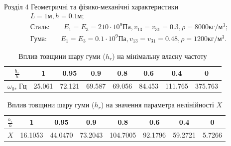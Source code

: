 \documentclass[handout, 8pt]{beamer}
\numberwithin{figure}{section}
\numberwithin{equation}{section}
\numberwithin{table}{section}
\begin{document}
\begin{frame}{Розділ 4}
Геометричні та фізико-механічні характеристики
\begin{equation}
\begin{gathered}
L=1\text{м}, h=0.1\text{м};\\
\text{Сталь:}\qquad
E_1=E_3=210\cdot 10^{9} Па, v_{13}=v_{31}=0.3, \rho=8000 кг/м^3;\\
\text{Гума:}\qquad
E_1=E_3=0.1\cdot 10^{9} Па, v_{13}=v_{31}=0.48, \rho=1200 кг/м^3.
\end{gathered}
\end{equation}

\begin{table}[h!]
\caption{Вплив товщини шару гуми ($h_{r}$) на мінімальну власну частоту}
\centering
 \begin{tabular}{| c | c | c | c | c | c | c | c |} 
 \hline
 $\displaystyle \frac{h_{r}}{h}$ & 1 & 0.95 & 0.9 & 0.8 & 0.6 & 0.4 & 0 \\ 
  \hline
 $\omega_0$, Гц & 25.061 & 72.121 & 69.587 & 69.056 & 84.453 & 111.765 & 375.763 \\
   \hline
\end{tabular}
\end{table}

\begin{table}[h!]
\caption{Вплив товщини шару гуми ($h_{r}$) на значення параметра нелінійності $X$}
\centering
 \begin{tabular}{| c | c | c | c | c | c | c | c |} 
 \hline
 $\displaystyle \frac{h_{r}}{h}$ & 1 & 0.95 & 0.9 & 0.8 & 0.6 & 0.4 & 0 \\ 
  \hline
 $X$ & 16.1053 & 44.0470 & 73.2043 & 104.7005 & 92.1796 & 59.2721 & 5.7266 \\
   \hline
\end{tabular}
\end{table}

\end{frame}
\end{document}
